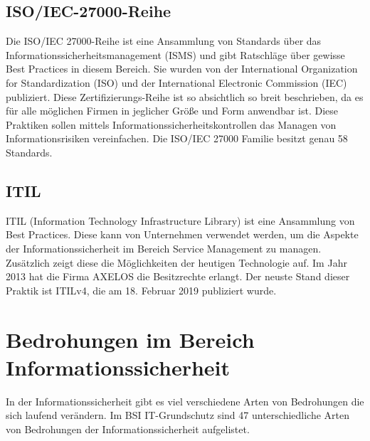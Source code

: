 \subsection{ISO/IEC-27000-Reihe}
Die ISO/IEC 27000-Reihe ist eine Ansammlung von Standards über das Informationssicherheitsmanagement (ISMS) und gibt Ratschläge über gewisse Best Practices in diesem Bereich. Sie wurden von der International Organization for Standardization (ISO) und der International Electronic Commission (IEC) publiziert. 
Diese Zertifizierungs-Reihe ist so absichtlich so breit beschrieben, da es für alle möglichen Firmen in jeglicher Größe und Form anwendbar ist.
Diese Praktiken sollen mittels Informationssicherheitskontrollen das Managen von Informationsrisiken vereinfachen. Die ISO/IEC 27000 Familie besitzt genau 58 Standards.

\subsection{ITIL}
ITIL (Information Technology Infrastructure Library) ist eine Ansammlung von Best Practices. Diese kann von Unternehmen verwendet werden, um die Aspekte der Informationssicherheit im Bereich Service Management zu managen. Zusätzlich zeigt diese die Möglichkeiten der heutigen Technologie auf. Im Jahr 2013 hat die Firma AXELOS die Besitzrechte erlangt.
Der neuste Stand dieser Praktik ist ITILv4, die am 18. Februar 2019 publiziert wurde.

\section{Bedrohungen im Bereich Informationssicherheit}
In der Informationssicherheit gibt es viel verschiedene Arten von Bedrohungen die sich laufend verändern. Im BSI IT-Grundschutz sind 47 unterschiedliche Arten von Bedrohungen der Informationssicherheit aufgelistet.

